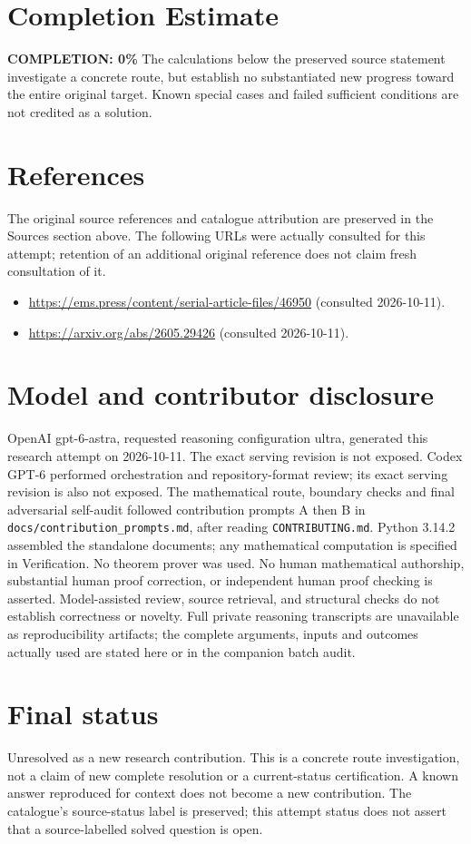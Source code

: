 \documentclass[11pt]{article}
\begin{document}
\section{Completion Estimate}
\noindent\textbf{COMPLETION: 0\%}
The calculations below the preserved source statement investigate a concrete route,
but establish no substantiated new progress toward the entire original target.
Known special cases and failed sufficient conditions are not credited as a solution.
\section{References}
The original source references and catalogue attribution are preserved in the
Sources section above. The following URLs were actually consulted for this attempt;
retention of an additional original reference does not claim fresh consultation of it.
\begin{itemize}
\item \url{https://ems.press/content/serial-article-files/46950} (consulted 2026-10-11). 
\item \url{https://arxiv.org/abs/2605.29426} (consulted 2026-10-11). 
\end{itemize}
\section{Model and contributor disclosure}
OpenAI gpt-6-astra, requested reasoning configuration ultra, generated this research
attempt on 2026-10-11. The exact serving revision is not exposed. Codex GPT-6
performed orchestration and repository-format review; its exact serving revision
is also not exposed. The mathematical route, boundary checks and final adversarial
self-audit followed contribution prompts A then B in
\texttt{docs/contribution\_prompts.md}, after reading \texttt{CONTRIBUTING.md}.
Python 3.14.2 assembled the standalone documents; any mathematical computation is
specified in Verification. No theorem prover was used. No human mathematical
authorship, substantial human proof correction, or independent human proof checking
is asserted. Model-assisted review, source retrieval, and structural checks do not
establish correctness or novelty. Full private reasoning transcripts are unavailable
as reproducibility artifacts; the complete arguments, inputs and outcomes actually
used are stated here or in the companion batch audit.
\section{Final status}
Unresolved as a new research contribution. This is a concrete route investigation,
not a claim of new complete resolution or a current-status certification. A known
answer reproduced for context does not become a new contribution. The catalogue's
source-status label is preserved; this attempt status does not assert that a
source-labelled solved question is open.
\end{document}
